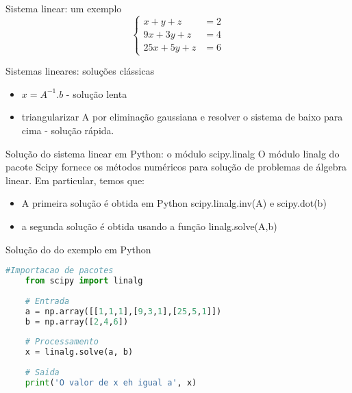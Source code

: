 \documentclass{beamer}
\begin{document}
	\begin{frame}{Sistema linear: um exemplo}
		\begin{equation*}\left\{
		\begin{array}{lr}
		x+y+z & = 2 \\
		9x+3y+z & = 4 \\
		25x+5y+z & = 6
		\end{array}
		\right.
		\end{equation*}
	\end{frame}
	
		\begin{frame}{Sistemas lineares: soluções clássicas}
			\begin{itemize}
				\item \(x = A^{-1}.b\) - solução lenta
				\item triangularizar A por eliminação gaussiana e resolver o sistema de baixo para cima - solução rápida.
			\end{itemize}
		\end{frame}
	
\begin{frame}[fragile]{Solução do sistema linear em Python: o módulo scipy.linalg}
	O módulo linalg do pacote Scipy fornece os métodos numéricos para solução de problemas de álgebra linear.  Em particular, temos que:
		\begin{itemize}
			\item A primeira solução é obtida em Python scipy.linalg.inv(A) e scipy.dot(b)
			\item a segunda solução é obtida usando a função linalg.solve(A,b)
		\end{itemize}


\end{frame}



\begin{frame}[fragile]{Solução do do exemplo em Python}
	
	\begin{lstlisting}[language=Python]
	#Importacao de pacotes
	from scipy import linalg
	
	# Entrada
	a = np.array([[1,1,1],[9,3,1],[25,5,1]])
	b = np.array([2,4,6])
	
	# Processamento
	x = linalg.solve(a, b)
	
	# Saida
	print('O valor de x eh igual a', x)
	\end{lstlisting}
	
\end{frame}
\end{document}
